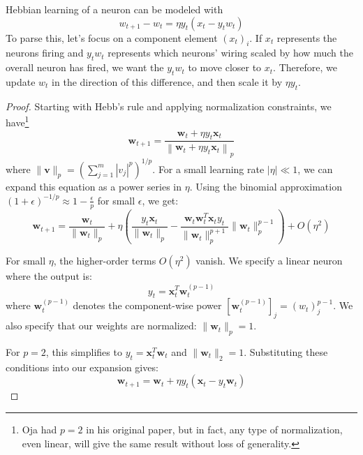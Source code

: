   \begin{theorem}
    Hebbian learning of a neuron can be modeled with
    \begin{equation}
      w_{t+1} - w_t = \eta y_t (x_t - y_t w_t)
    \end{equation}
    To parse this, let's focus on a component element $(x_t)_i$. If $x_t$ represents the neurons firing and $y_t w_t$ represents which neurons' wiring scaled by how much the overall neuron has fired, we want the $y_t w_t$ to move closer to $x_t$. Therefore, we update $w_t$ in the direction of this difference, and then scale it by $\eta y_t$. 
  \end{theorem}
  \begin{proof}
    Starting with Hebb's rule and applying normalization constraints, we have\footnote{Oja had $p = 2$ in his original paper, but in fact, any type of normalization, even linear, will give the same result without loss of generality.}
    \begin{equation}
      \mathbf{w}_{t+1} = \frac{\mathbf{w}_t + \eta y_t \mathbf{x}_t}{\left\|\mathbf{w}_t + \eta y_t \mathbf{x}_t\right\|_p}
    \end{equation}
    where $\|\mathbf{v}\|_p = \left(\sum_{j=1}^{m} |v_j|^p\right)^{1/p}$. For a small learning rate $|\eta| \ll 1$, we can expand this equation as a power series in $\eta$. Using the binomial approximation $(1 + \epsilon)^{-1/p} \approx 1 - \frac{\epsilon}{p}$ for small $\epsilon$, we get:
    \begin{equation}
      \mathbf{w}_{t+1} = \frac{\mathbf{w}_t}{\|\mathbf{w}_t\|_p} + \eta \left(\frac{y_t\mathbf{x}_t}{\|\mathbf{w}_t\|_p} - \frac{\mathbf{w}_t \mathbf{w}_t^T \mathbf{x}_t y_t}{\|\mathbf{w}_t\|_p^{p+1}} \|\mathbf{w}_t\|_p^{p-1}\right) + O(\eta^2)
    \end{equation}
   
    For small $\eta$, the higher-order terms $O(\eta^2)$ vanish. We specify a linear neuron where the output is:
    \begin{equation}
      y_t = \mathbf{x}_t^T \mathbf{w}_t^{(p-1)}
    \end{equation}
    where $\mathbf{w}_t^{(p-1)}$ denotes the component-wise power $[\mathbf{w}_t^{(p-1)}]_j = (w_t)_j^{p-1}$. We also specify that our weights are normalized: $\|\mathbf{w}_t\|_p = 1$. 
   
    For $p = 2$, this simplifies to $y_t = \mathbf{x}_t^T \mathbf{w}_t$ and $\|\mathbf{w}_t\|_2 = 1$. Substituting these conditions into our expansion gives:
    \begin{equation}
      \mathbf{w}_{t+1} = \mathbf{w}_t + \eta y_t(\mathbf{x}_t - y_t\mathbf{w}_t)
    \end{equation}
  \end{proof}

